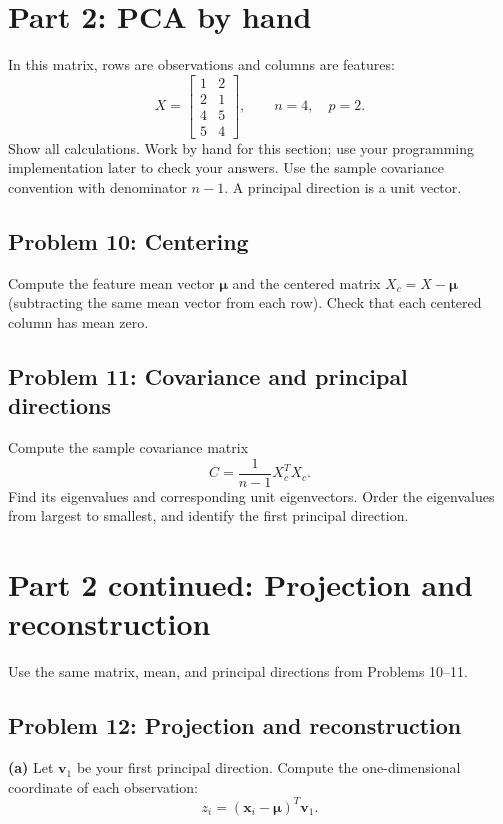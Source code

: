 \documentclass[12pt,letterpaper]{article}
\begin{document}
\section*{Part 2: PCA by hand}
In this matrix, rows are
observations and columns are features:
\[
X=\begin{bmatrix}1&2\\2&1\\4&5\\5&4\end{bmatrix},\qquad n=4,\quad p=2.
\]
Show all calculations. Work by hand for this section; use your programming
implementation later to check your answers. Use the sample covariance
convention with denominator $n-1$. A principal direction is a unit vector.

\subsection*{Problem 10: Centering}
Compute the feature mean vector $\boldsymbol\mu$ and the centered matrix
$X_c=X-\boldsymbol\mu$ (subtracting the same mean vector from each row).
Check that each centered column has mean zero.
\vspace{1.55in}

\subsection*{Problem 11: Covariance and principal directions}
Compute the sample covariance matrix
\[
C=\frac{1}{n-1}X_c^TX_c.
\]
Find its eigenvalues and corresponding unit eigenvectors. Order the eigenvalues
from largest to smallest, and identify the first principal direction.
\newpage
\section*{Part 2 continued: Projection and reconstruction}
Use the same matrix, mean, and principal directions from Problems 10--11.

\subsection*{Problem 12: Projection and reconstruction}
\textbf{(a)} Let $\mathbf v_1$ be your first principal direction. Compute the
one-dimensional coordinate of each observation:
\[
z_i=(\mathbf x_i-\boldsymbol\mu)^T\mathbf v_1.
\]
\vspace{0.85in}
\end{document}
